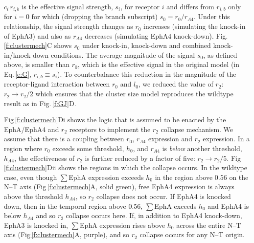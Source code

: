 \documentclass[9pt,lineno]{elife}
\begin{document}
$c_i\,r_{i,b}$ is the effective signal strength, $s_i$, for receptor $i$ and differs from $r_{i,b}$ only for $i=0$ for which (dropping the branch subscript) $s_0 = r_0/r_{\!\scriptscriptstyle A4}$.
Under this relationship, the signal strength changes as $r_0$ increases (simulating the knock-in of EphA3) and also as $r_{\!\scriptscriptstyle A4}$ decreases (simulating EphA4 knock-down).  
Fig.\,\ref{f:clustermech}C shows $s_0$ under knock-in, knock-down and combined knock-in/knock-down conditions.
The average magnitude of the signal $s_0$, as defined above, is smaller than $r_0$, which is the effective signal in the original model (in Eq.\,\ref{e:G}, $r_{i,b} \equiv s_i$). To counterbalance this reduction in the magnitude of the receptor-ligand interaction between $r_0$ and $l_0$, we reduced the value of $r_2$: $r_2 \rightarrow r_2/2$ which ensures that the cluster size model reproduces the wildtype result as in Fig.\,\ref{f:GJ}D.

Fig\,\ref{f:clustermech}Di shows the logic that is assumed to be enacted by the EphA/EphA4 and $r_2$ receptors to implement the $r_2$ collapse mechanism. We assume that there is a coupling between $r_0$, $r_{A4}$ expression and $r_2$ expression. In a region where $r_0$ exceeds some threshold, $h_0$, and $r_{A4}$ is \emph{below} another threshold, $h_{A4}$, the effectiveness of $r_2$ is further reduced by a factor of five: $r_2 \rightarrow r_2/5$.
Fig\,\ref{f:clustermech}Dii shows the regions in which the collapse occurs.
In the wildtype case, even though $\sum$EphA expression exceeds $h_0$ in the region above 0.56 on the N--T axis (Fig\,\ref{f:clustermech}A, solid green), free EphA4 expression is always above the threshold $h_{A4}$, so $r_2$ collapse does not occur.
If EphA4 is knocked down, then in the temporal region above 0.56, $\sum$EphA exceeds $h_0$ and EphA4 is below $h_{A4}$ and so $r_2$ collapse occurs here.
If, in addition to EphA4 knock-down, EphA3 is knocked in, $\sum$EphA expression rises above $h_0$ across the entire N--T axis (Fig\,\ref{f:clustermech}A, purple), and so $r_2$ collapse occurs for any N--T origin.
\end{document}
